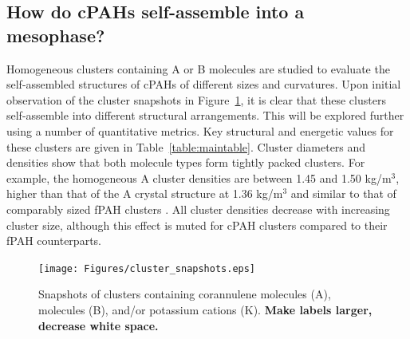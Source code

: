 \subsection{How do cPAHs self-assemble into a mesophase?}
%
Homogeneous clusters containing A or B molecules are studied to evaluate the self-assembled structures of cPAHs of different sizes and curvatures. Upon initial observation of the cluster snapshots in Figure~\ref{fig:clustersnapshots}, it is clear that these clusters self-assemble into different structural arrangements.  This will be explored further using a number of quantitative metrics. Key structural and energetic values for these clusters are given in Table~\ref{table:maintable}. Cluster diameters and densities show that both molecule types form tightly packed clusters. For example, the homogeneous A cluster densities are between 1.45 and 1.50 kg/$\text{m}^{3}$, higher than that of the A crystal structure at 1.36 kg/$\text{m}^{3}$ \cite{CORANN11unitcell} and similar to that of comparably sized fPAH clusters \cite{chen2014size}. All cluster densities decrease with increasing cluster size, although this effect is muted for cPAH clusters compared to their fPAH counterparts. 
%
\begin{figure}[!tbh]
\centering
\texttt{[image: Figures/cluster\_snapshots.eps]}
\caption{Snapshots of clusters containing corannulene molecules (A),  molecules (B), and/or potassium cations (K). \textbf{Make labels larger, decrease white space.}}
\label{fig:clustersnapshots}
\end{figure}
%
%
